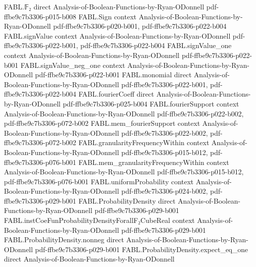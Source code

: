 \begin{theorem}
\label{FABL.signEncode_add}
\leanok
{}
\proofstep
  {FABL.𝔽₂}
  {direct}
  {Analysis-of-Boolean-Functions-by-Ryan-ODonnell}
  {pdf-ffbe9c7b3306-p015-b008}
\proofstep
  {FABL.Sign}
  {context}
  {Analysis-of-Boolean-Functions-by-Ryan-ODonnell}
  {pdf-ffbe9c7b3306-p020-b001,
    pdf-ffbe9c7b3306-p022-b004}
\proofstep
  {FABL.signValue}
  {context}
  {Analysis-of-Boolean-Functions-by-Ryan-ODonnell}
  {pdf-ffbe9c7b3306-p022-b001,
    pdf-ffbe9c7b3306-p022-b004}
\proofstep
  {FABL.signValue_one}
  {context}
  {Analysis-of-Boolean-Functions-by-Ryan-ODonnell}
  {pdf-ffbe9c7b3306-p022-b001}
\proofstep
  {FABL.signValue_neg_one}
  {context}
  {Analysis-of-Boolean-Functions-by-Ryan-ODonnell}
  {pdf-ffbe9c7b3306-p022-b001}
\proofstep
  {FABL.monomial}
  {direct}
  {Analysis-of-Boolean-Functions-by-Ryan-ODonnell}
  {pdf-ffbe9c7b3306-p022-b001,
    pdf-ffbe9c7b3306-p022-b004}
\proofstep
  {FABL.fourierCoeff}
  {direct}
  {Analysis-of-Boolean-Functions-by-Ryan-ODonnell}
  {pdf-ffbe9c7b3306-p025-b004}
\proofstep
  {FABL.fourierSupport}
  {context}
  {Analysis-of-Boolean-Functions-by-Ryan-ODonnell}
  {pdf-ffbe9c7b3306-p022-b002,
    pdf-ffbe9c7b3306-p072-b002}
\proofstep
  {FABL.mem_fourierSupport}
  {context}
  {Analysis-of-Boolean-Functions-by-Ryan-ODonnell}
  {pdf-ffbe9c7b3306-p022-b002,
    pdf-ffbe9c7b3306-p072-b002}
\proofstep
  {FABL.granularityFrequencyWithin}
  {context}
  {Analysis-of-Boolean-Functions-by-Ryan-ODonnell}
  {pdf-ffbe9c7b3306-p015-b012,
    pdf-ffbe9c7b3306-p076-b001}
\proofstep
  {FABL.mem_granularityFrequencyWithin}
  {context}
  {Analysis-of-Boolean-Functions-by-Ryan-ODonnell}
  {pdf-ffbe9c7b3306-p015-b012,
    pdf-ffbe9c7b3306-p076-b001}
\proofstep
  {FABL.uniformProbability}
  {context}
  {Analysis-of-Boolean-Functions-by-Ryan-ODonnell}
  {pdf-ffbe9c7b3306-p024-b002,
    pdf-ffbe9c7b3306-p029-b001}
\proofstep
  {FABL.ProbabilityDensity}
  {direct}
  {Analysis-of-Boolean-Functions-by-Ryan-ODonnell}
  {pdf-ffbe9c7b3306-p029-b001}
\proofstep
  {FABL.instCoeFunProbabilityDensityForallF₂CubeReal}
  {context}
  {Analysis-of-Boolean-Functions-by-Ryan-ODonnell}
  {pdf-ffbe9c7b3306-p029-b001}
\proofstep
  {FABL.ProbabilityDensity.nonneg}
  {direct}
  {Analysis-of-Boolean-Functions-by-Ryan-ODonnell}
  {pdf-ffbe9c7b3306-p029-b001}
\proofstep
  {FABL.ProbabilityDensity.expect_eq_one}
  {direct}
  {Analysis-of-Boolean-Functions-by-Ryan-ODonnell}

\end{theorem}
